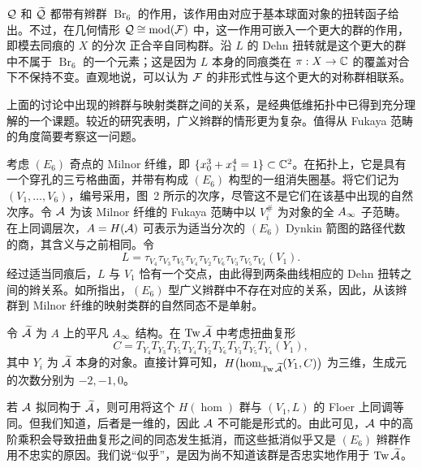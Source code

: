 $\mathcal Q$ 和 $\widetilde{\mathcal Q}$ 都带有辫群 $\operatorname{Br}_6$ 的作用，该作用由对应于基本球面对象的扭转函子给出。不过，在几何情形 $\mathcal Q\cong\operatorname{mod}(\mathcal F)$ 中，这一作用可嵌入一个更大的群的作用，即模去同痕的 $X$ 的分次
正合辛自同构群。沿 $L$ 的 Dehn 扭转就是这个更大的群中不属于 $\operatorname{Br}_6$ 的一个元素；这是因为 $L$ 本身的同痕类在 $\pi:X\to\mathbb C$ 的覆盖对合下不保持不变。直观地说，可以认为 $\mathcal F$ 的非形式性与这个更大的对称群相联系。
\clearpage
{}\begin{note}\label{st:20.7}
上面的讨论中出现的辫群与映射类群之间的关系，是经典低维拓扑中已得到充分理解的一个课题。较近的研究表明，广义辫群的情形更为复杂。值得从 Fukaya 范畴的角度简要考察这一问题。

考虑 $(E_6)$ 奇点的 Milnor 纤维，即 $\{x_0^3+x_1^4=1\}\subset\mathbb C^2$。在拓扑上，它是具有一个穿孔的三亏格曲面，并带有构成 $(E_6)$ 构型的一组消失圈基。将它们记为 $(V_1,\ldots,V_6)$，编号采用，图~2 所示的次序，尽管这不是它们在该基中出现的自然次序。令 $\mathcal A$ 为该 Milnor 纤维的 Fukaya 范畴中以 $V_i^\#$ 为对象的全 $A_\infty$ 子范畴。在上同调层次，$A=H(\mathcal A)$ 可表示为适当分次的 $(E_6)$ Dynkin 箭图的路径代数的商，其含义与之前相同。令
\[
L=\tau_{V_4}\tau_{V_3}\tau_{V_5}\tau_{V_4}\tau_{V_2}\tau_{V_6}\tau_{V_3}\tau_{V_5}\tau_{V_4}(V_1).
\]
经过适当同痕后，$L$ 与 $V_1$ 恰有一个交点，由此得到两条曲线相应的 Dehn 扭转之间的辫关系。如所指出，$(E_6)$ 型广义辫群中不存在对应的关系，因此，从该辫群到 Milnor 纤维的映射类群的自然同态不是单射。

令 $\widetilde{\mathcal A}$ 为 $A$ 上的平凡 $A_\infty$ 结构。在 $\operatorname{Tw}\widetilde{\mathcal A}$ 中考虑扭曲复形
\[
C=T_{Y_4}T_{Y_3}T_{Y_5}T_{Y_4}T_{Y_2}T_{Y_6}T_{Y_3}T_{Y_5}T_{Y_4}(Y_1),
\]
其中 $Y_i$ 为 $\widetilde{\mathcal A}$ 本身的对象。直接计算可知，$H\bigl(\hom_{\operatorname{Tw}\widetilde{\mathcal A}}(Y_1,C)\bigr)$ 为三维，生成元的次数分别为 $-2,-1,0$。

若 $\mathcal A$ 拟同构于 $\widetilde{\mathcal A}$，则可用将这个 $H(\hom)$ 群与 $(V_1,L)$ 的 Floer 上同调等同。但我们知道，后者是一维的，因此 $\mathcal A$ 不可能是形式的。由此可见，$\mathcal A$ 中的高阶乘积会导致扭曲复形之间的同态发生抵消，而这些抵消似乎又是 $(E_6)$ 辫群作用不忠实的原因。我们说“似乎”，是因为尚不知道该群是否忠实地作用于 $\operatorname{Tw}\widetilde{\mathcal A}$。
\end{note}
